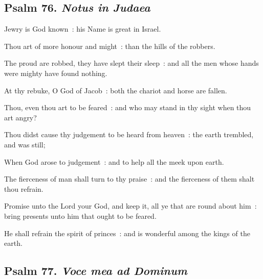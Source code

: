\subsection{Psalm 76. \textit{Notus in Judaea}}


 Jewry is God known~: his Name is great in Israel.\par
{}
Thou art of more honour and might~: than the hills of the robbers.\par
{}The proud are robbed, they have slept their sleep~: and all the men whose hands were mighty have found nothing.\par
{}At thy rebuke, O God of Jacob~: both the chariot and horse are fallen.\par
{}Thou, even thou art to be feared~: and who may stand in thy sight when thou art angry?\par
{}Thou didst cause thy judgement to be heard from heaven~: the earth trembled, and was still;\par
{}When God arose to judgement~: and to help all the meek upon earth.\par
{}The fierceness of man shall turn to thy praise~: and the fierceness of them shalt thou refrain.\par
{}Promise unto the Lord your God, and keep it, all ye that are round about him~: bring presents unto him that ought to be feared.\par
{}He shall refrain the spirit of princes~: and is wonderful among the kings of the earth.\par

\subsection{Psalm 77. \textit{Voce mea ad Dominum}}


